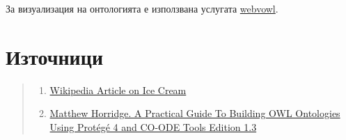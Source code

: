 \documentclass[12pt]{article}
\begin{document}
За визуализация на онтологията е използвана услугата  \href{http://vowl.visualdataweb.org/webvowl-old/webvowl-old.html}{webvowl}.




\listoffigures

\section{Източници}

\begin{quote}

    \begin{enumerate}
    
    \item \href{https://en.wikipedia.org/wiki/Ice_cream}{Wikipedia Article on Ice Cream}
    
    \item \href{https://www.researchgate.net/publication/272829948_A_Practical_Guide_To_Building_OWL_Ontologies_Using_Protege_4_and_CO-ODE_Tools_Edition_13}{Matthew Horridge. A Practical Guide To Building OWL Ontologies Using Protégé 4 and CO-ODE Tools Edition 1.3}

    
    
    \end{enumerate}

\end{quote}
\end{document}
